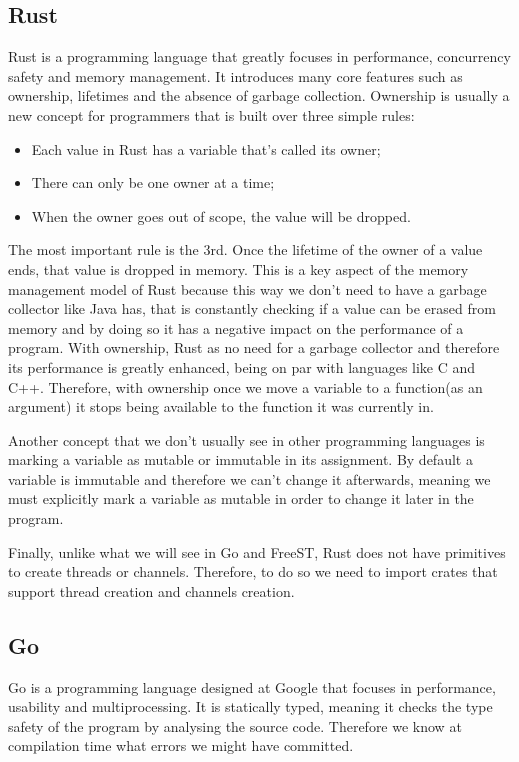 \documentclass[runningheads]{llncs}
\begin{document}
\subsection{Rust}
Rust is a programming language that greatly focuses in performance, concurrency safety and memory management.
It introduces many core features such as ownership, lifetimes and the absence of garbage collection.
Ownership is usually a new concept for programmers that is built over three simple rules:
\begin{itemize}
\item Each value in Rust has a variable that’s called its owner;
\item There can only be one owner at a time;
\item When the owner goes out of scope, the value will be dropped.
\end{itemize}

The most important rule is the 3rd. Once the lifetime of the owner of a value ends, that value is dropped in memory. This is a key aspect of the memory management model of Rust because this way we don't need to have a garbage collector like Java has, that is constantly checking if a value can be erased from memory and by doing so it has a negative impact on the performance of a program. With ownership, Rust as no need for a garbage collector and therefore its performance is greatly enhanced, being on par with languages like C and C++. Therefore, with ownership once we move a variable to a function(as an argument) it stops being available to the function it was currently in.

Another concept that we don't usually see in other programming languages is marking a variable as mutable or immutable in its assignment. By default a variable is immutable and therefore we can't change it afterwards, meaning we must explicitly mark a variable as mutable in order to change it later in the program.

Finally, unlike what we will see in Go and FreeST, Rust does not have primitives to create threads or channels. Therefore, to do so we need to import crates that support thread creation and channels creation.
\subsection{Go}
Go is a programming language designed at Google that focuses in performance, usability and multiprocessing.
It is statically typed, meaning it checks the type safety of the program by analysing the source code. Therefore we know at compilation time what errors we might have committed.
\end{document}
